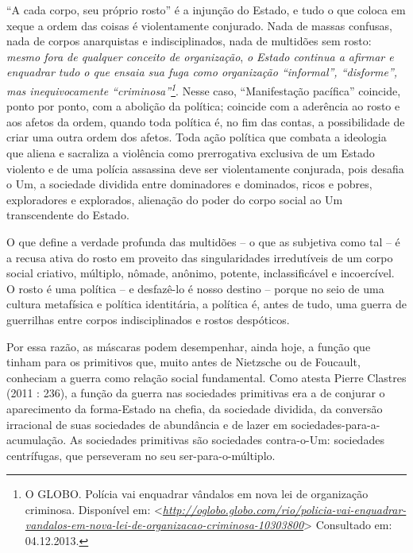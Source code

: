 ``A cada corpo, seu próprio rosto'' é a injunção do Estado, e tudo o que
coloca em xeque a ordem das coisas é violentamente conjurado. Nada de
massas confusas, nada de corpos anarquistas e indisciplinados, nada de
multidões sem rosto: \emph{\emph{mesmo fora de qualquer conceito de
organização}}, \emph{\emph{o Estado continua a afirmar e enquadrar tudo
o que ensaia sua fuga como organização ``informal'', ``disforme'', mas
inequivocamente ``criminosa''}\emph{\footnote{O GLOBO. Polícia vai
  enquadrar vândalos em nova lei de organização criminosa. Disponível
  em:
  \textless{}\href{http://oglobo.globo.com/rio/policia-vai-enquadrar-vandalos-em-nova-lei-de-organizacao-criminosa-10303800}{\emph{http://oglobo.globo.com/rio/policia-vai-enquadrar-vandalos-em-nova-lei-de-organizacao-criminosa-10303800}}\textgreater{}
  Consultado em: 04.12.2013.}}}. Nesse caso, ``Manifestação pacífica''
coincide, ponto por ponto, com a abolição da política; coincide com a
aderência ao rosto e aos afetos da ordem, quando toda política é, no fim
das contas, a possibilidade de criar uma outra ordem dos afetos. Toda
ação política que combata a ideologia que aliena e sacraliza a violência
como prerrogativa exclusiva de um Estado violento e de uma polícia
assassina deve ser violentamente conjurada, pois desafia o Um, a
sociedade dividida entre dominadores e dominados, ricos e pobres,
exploradores e explorados, alienação do poder do corpo social ao Um
transcendente do Estado.

O que define a verdade profunda das multidões -- o que as subjetiva como
tal -- é a recusa ativa do rosto em proveito das singularidades
irredutíveis de um corpo social criativo, múltiplo, nômade, anônimo,
potente, inclassificável e incoercível. O rosto é uma política -- e
desfazê-lo é nosso destino -- porque no seio de uma cultura metafísica e
política identitária, a política é, antes de tudo, uma guerra de
guerrilhas entre corpos indisciplinados e rostos despóticos.

Por essa razão, as máscaras podem desempenhar, ainda hoje, a função que
tinham para os primitivos que, muito antes de Nietzsche ou de Foucault,
conheciam a guerra como relação social fundamental. Como atesta Pierre
Clastres (2011 : 236), a função da guerra nas sociedades primitivas era
a de conjurar o aparecimento da forma-Estado na chefia, da sociedade
dividida, da conversão irracional de suas sociedades de abundância e de
lazer em sociedades-para-a-acumulação. As sociedades primitivas são
sociedades contra-o-Um: sociedades centrífugas, que perseveram no seu
ser-para-o-múltiplo.

